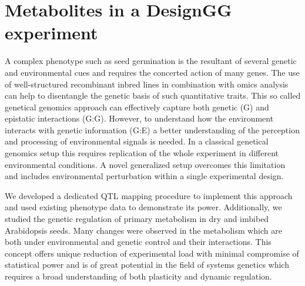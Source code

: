 \section{Metabolites in a DesignGG experiment}
\label{sect:Metabolites}
A complex phenotype such as seed germination is the resultant of several genetic and environmental 
cues and requires the concerted action of many genes. The use of well-structured recombinant inbred 
lines in combination with omics analysis can help to disentangle the genetic basis of such 
quantitative traits. This so called genetical genomics approach can effectively capture both 
genetic (G) and epistatic interactions (G:G). However, to understand how the environment interacts 
with genetic information (G:E) a better understanding of the perception and processing of 
environmental signals is needed. In a classical genetical genomics setup this requires replication 
of the whole experiment in different environmental conditions. A novel generalized setup overcomes 
this limitation and includes environmental perturbation within a single experimental design. 

We developed a dedicated QTL mapping procedure to implement this approach and used existing 
phenotype data to demonstrate its power. Additionally, we studied the genetic regulation of 
primary metabolism in dry and imbibed Arabidopsis seeds. Many changes were observed in the 
metabolism which are both under environmental and genetic control and their interactions. 
This concept offers unique reduction of experimental load with minimal compromise of statistical 
power and is of great potential in the field of systems genetics which requires a broad 
understanding of both plasticity and dynamic regulation.

